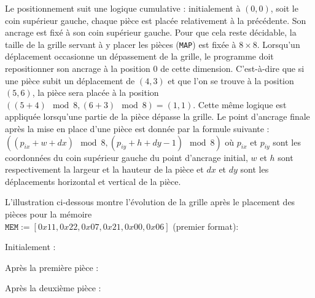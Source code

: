 \noindent
Le positionnement suit une logique cumulative : initialement à $(0, 
0)$, soit le coin supérieur gauche, chaque pièce est placée 
relativement à la précédente. Son ancrage est fixé à son coin 
supérieur gauche. Pour que cela reste décidable, la taille de la 
grille servant à y placer les pièces (\texttt{MAP}) est fixée à $8 
\times 8$. Lorsqu'un déplacement occasionne un dépassement de la 
grille, le programme doit repositionner son ancrage à la position
$0$ de cette dimension. C'est-à-dire que si une pièce subit un 
déplacement de $(4, 3)$ et que l'on se trouve à la position $(5, 6)$,
la pièce sera placée à la position $((5 + 4) \mod 8, (6 + 3) \mod 8) 
= (1, 1)$. Cette même logique est appliquée lorsqu'une partie de la 
pièce dépasse la grille. Le point d'ancrage finale après la mise en 
place d'une pièce est donnée par la formule suivante : $((p_{ix}
 + w + dx) \mod 8, (p_{iy} + h + dy - 1) \mod 8)$ où $p_{ix}$ et 
 $p_{iy}$ sont les coordonnées du coin supérieur gauche du point 
d'ancrage initial, $w$ et $h$ sont respectivement la largeur et la
hauteur de la pièce et $dx$ et $dy$ sont les déplacements horizontal
et vertical de la pièce.
\medskip

\noindent
L'illustration ci-dessous montre l'évolution de la grille après le 
placement des pièces pour la mémoire \\
$\texttt{MEM} {:=} [0x11, 0x22, 0x07, 0x21, 0x00, 0x06]$ (premier 
format):
\medskip

\begin{minipage}{0.2\textwidth}
{\scriptsize Initialement : }\\
\end{minipage}
\begin{minipage}{0.2\textwidth}
{\scriptsize Après la première pièce :} \\
\end{minipage}
\begin{minipage}{0.33\textwidth}
  {\scriptsize Après la deuxième pièce :} \\
\end{minipage}
\medskip

